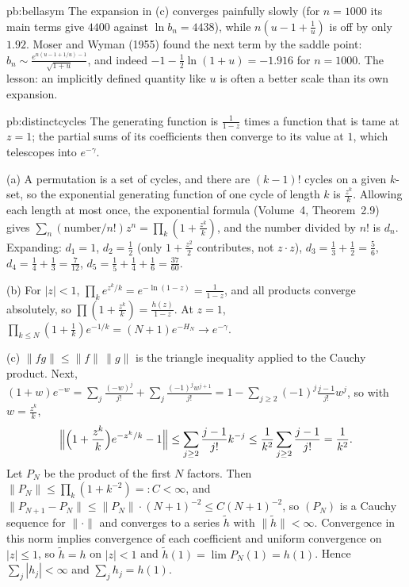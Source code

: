 \begin{solution}{pb:bellasym}
\leads The expansion in (c) converges painfully slowly (for $n=1000$ its main terms give $4400$ against $\ln b_n=4438$), while $n(u-1+\frac1u)$ is off by only $1.92$.
Moser and Wyman (1955) found the next term by the saddle point: $b_n\sim\frac{e^{n(u-1+1/u)-1}}{\sqrt{1+u}}$, and indeed $-1-\frac12\ln(1+u)=-1.916$ for $n=1000$. The
lesson: an implicitly defined quantity like $u$ is often a better scale than its own expansion.
\end{solution}

\begin{solution}{pb:distinctcycles}
\idea The generating function is $\frac1{1-z}$ times a function that is tame at $z=1$; the partial sums of its coefficients then converge to its value at $1$, which
telescopes into $e^{-\gamma}$.

\writeup (a) A permutation is a set of cycles, and there are $(k-1)!$ cycles on a given $k$-set, so the exponential generating function of one cycle of length $k$
is $\frac{z^k}k$. Allowing each length at most once, the exponential formula (Volume~4, Theorem~2.9) gives $\sum_n(\text{number}/n!)z^n=\prod_k(1+\frac{z^k}k)$, and the number divided
by $n!$ is $d_n$. Expanding: $d_1=1$, $d_2=\frac12$ (only $1+\frac{z^2}2$ contributes, not $z\cdot z$), $d_3=\frac13+\frac12=\frac56$, $d_4=\frac14+\frac13=\frac7{12}$, $d_5=\frac15+\frac14+\frac16=\frac{37}{60}$.

(b) For $|z|<1$, $\prod_ke^{z^k/k}=e^{-\ln(1-z)}=\frac1{1-z}$, and all products converge absolutely, so $\prod(1+\frac{z^k}k)=\frac{h(z)}{1-z}$. At $z=1$,
$\prod_{k\le N}(1+\frac1k)e^{-1/k}=(N+1)e^{-H_N}\to e^{-\gamma}$.

(c) $\|fg\|\le\|f\|\,\|g\|$ is the triangle inequality applied to the Cauchy product. Next, $(1+w)e^{-w}=\sum_j\frac{(-w)^j}{j!}+\sum_j\frac{(-1)^jw^{j+1}}{j!}=1-\sum_{j\ge2}(-1)^j\frac{j-1}{j!}w^j$,
so with $w=\frac{z^k}k$,
\[
\Bigl\|\Bigl(1+\frac{z^k}k\Bigr)e^{-z^k/k}-1\Bigr\|\le\sum_{j\ge2}\frac{j-1}{j!}k^{-j}\le\frac1{k^2}\sum_{j\ge2}\frac{j-1}{j!}=\frac1{k^2}.
\]
Let $P_N$ be the product of the first $N$ factors. Then $\|P_N\|\le\prod_k(1+k^{-2})=:C<\infty$, and $\|P_{N+1}-P_N\|\le\|P_N\|\cdot(N+1)^{-2}\le C(N+1)^{-2}$, so $(P_N)$ is a Cauchy
sequence for $\|\cdot\|$ and converges to a series $\tilde h$ with $\|\tilde h\|<\infty$. Convergence in this norm implies convergence of each coefficient and uniform convergence on
$|z|\le1$, so $\tilde h=h$ on $|z|<1$ and $\tilde h(1)=\lim P_N(1)=h(1)$. Hence $\sum_j|h_j|<\infty$ and $\sum_jh_j=h(1)$.


\end{solution}
